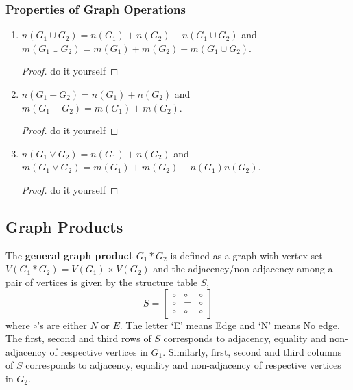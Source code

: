 \subsubsection{Properties of Graph Operations}
\begin{enumerate}
	\item $n(G_1 \cup G_2) = n(G_1) + n(G_2) - n(G_1 \cup G_2)$ and\\
		$m(G_1 \cup G_2) = m(G_1) + m(G_2) - m(G_1 \cup G_2)$.
		\begin{proof}
			do it yourself
		\end{proof}
	\item $n(G_1+G_2) = n(G_1) + n(G_2)$ and \\ $m(G_1+G_2) = m(G_1) + m(G_2)$.
		\begin{proof}
			do it yourself
		\end{proof}
	\item $n(G_1 \vee G_2) = n(G_1)+n(G_2)$ and \\ $m(G_1 \vee G_2) = m(G_1)+m(G_2)+n(G_1)n(G_2)$.
		\begin{proof}
			do it yourself
		\end{proof}
\end{enumerate}

\subsection{Graph Products}
\begin{definition}
	The \textbf{general graph product} $G_1 \ast G_2$ is defined as a graph with vertex set $V(G_1 \ast G_2) = V(G_1) \times V(G_2)$ and the adjacency/non-adjacency among a pair of vertices is given by the structure table $S$, 
$$ S = \begin{bmatrix} \circ & \circ & \circ \\ \circ & = & \circ \\ \circ & \circ & \circ \end{bmatrix} $$
	where $\circ$'s are either $N$ or $E$. The letter `E' means Edge and `N' means No edge.\\

	The first, second and third rows of $S$ corresponds to adjacency, equality and non-adjacency of respective vertices in $G_1$. Similarly, first, second and third columns of $S$ corresponds to adjacency, equality and non-adjacency of respective vertices in $G_2$.
\end{definition}

